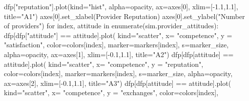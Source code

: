 \documentclass[
  letterpaper,
  DIV=11,
  numbers=noendperiod]{scrartcl}
\newenvironment{Shaded}{\begin{snugshade}}{\end{snugshade}}
\newcommand{\BuiltInTok}[1]{\textcolor[rgb]{0.00,0.23,0.31}{#1}}
\newcommand{\ControlFlowTok}[1]{\textcolor[rgb]{0.00,0.23,0.31}{#1}}
\newcommand{\DecValTok}[1]{\textcolor[rgb]{0.68,0.00,0.00}{#1}}
\newcommand{\FloatTok}[1]{\textcolor[rgb]{0.68,0.00,0.00}{#1}}
\newcommand{\KeywordTok}[1]{\textcolor[rgb]{0.00,0.23,0.31}{#1}}
\newcommand{\NormalTok}[1]{\textcolor[rgb]{0.00,0.23,0.31}{#1}}
\newcommand{\OperatorTok}[1]{\textcolor[rgb]{0.37,0.37,0.37}{#1}}
\newcommand{\StringTok}[1]{\textcolor[rgb]{0.13,0.47,0.30}{#1}}
\begin{document}
\begin{Shaded}
\begin{Highlighting}[]
\NormalTok{    dfp[}\StringTok{"reputation"}\NormalTok{].plot(kind}\OperatorTok{=}\StringTok{"hist"}\NormalTok{, alpha}\OperatorTok{=}\NormalTok{opacity, ax}\OperatorTok{=}\NormalTok{axes[}\DecValTok{0}\NormalTok{], xlim}\OperatorTok{=}\NormalTok{[}\OperatorTok{{-}}\FloatTok{1.1}\NormalTok{,}\FloatTok{1.1}\NormalTok{], title}\OperatorTok{=}\StringTok{"A1"}\NormalTok{)}
\NormalTok{    axes[}\DecValTok{0}\NormalTok{].set\_xlabel(}\StringTok{\textquotesingle{}Provider Reputation\textquotesingle{}}\NormalTok{)}
\NormalTok{    axes[}\DecValTok{0}\NormalTok{].set\_ylabel(}\StringTok{"Number of providers"}\NormalTok{)}
    \ControlFlowTok{for}\NormalTok{ index, attitude }\KeywordTok{in} \BuiltInTok{enumerate}\NormalTok{(sim.provider\_attitudes):}
\NormalTok{        dfp[dfp[}\StringTok{"attitude"}\NormalTok{] }\OperatorTok{==}\NormalTok{ attitude].plot(}
\NormalTok{            kind}\OperatorTok{=}\StringTok{"scatter"}\NormalTok{, x}\OperatorTok{=} \StringTok{"competence"}\NormalTok{, y }\OperatorTok{=} \StringTok{"satisfaction"}\NormalTok{, color}\OperatorTok{=}\NormalTok{colors[index], }
\NormalTok{            marker}\OperatorTok{=}\NormalTok{markers[index], s}\OperatorTok{=}\NormalTok{marker\_size, alpha}\OperatorTok{=}\NormalTok{opacity,}
\NormalTok{            ax}\OperatorTok{=}\NormalTok{axes[}\DecValTok{1}\NormalTok{], xlim}\OperatorTok{=}\NormalTok{[}\OperatorTok{{-}}\FloatTok{0.1}\NormalTok{,}\FloatTok{1.1}\NormalTok{], title}\OperatorTok{=}\StringTok{"A2"}\NormalTok{)}
\NormalTok{        dfp[dfp[}\StringTok{\textquotesingle{}attitude\textquotesingle{}}\NormalTok{] }\OperatorTok{==}\NormalTok{ attitude].plot(}
\NormalTok{            kind}\OperatorTok{=}\StringTok{"scatter"}\NormalTok{, x}\OperatorTok{=} \StringTok{"competence"}\NormalTok{, y }\OperatorTok{=} \StringTok{"reputation"}\NormalTok{, color}\OperatorTok{=}\NormalTok{colors[index], }
\NormalTok{            marker}\OperatorTok{=}\NormalTok{markers[index], s}\OperatorTok{=}\NormalTok{marker\_size, alpha}\OperatorTok{=}\NormalTok{opacity, }
\NormalTok{            ax}\OperatorTok{=}\NormalTok{axes[}\DecValTok{2}\NormalTok{], xlim}\OperatorTok{=}\NormalTok{[}\OperatorTok{{-}}\FloatTok{0.1}\NormalTok{,}\FloatTok{1.1}\NormalTok{], title}\OperatorTok{=}\StringTok{"A3"}\NormalTok{)}
\NormalTok{        dfp[dfp[}\StringTok{\textquotesingle{}attitude\textquotesingle{}}\NormalTok{] }\OperatorTok{==}\NormalTok{ attitude].plot(}
\NormalTok{            kind}\OperatorTok{=}\StringTok{"scatter"}\NormalTok{, x}\OperatorTok{=} \StringTok{"competence"}\NormalTok{, y }\OperatorTok{=} \StringTok{"exchanges"}\NormalTok{, color}\OperatorTok{=}\NormalTok{colors[index], }

\end{Highlighting}
\end{Shaded}
\end{document}
